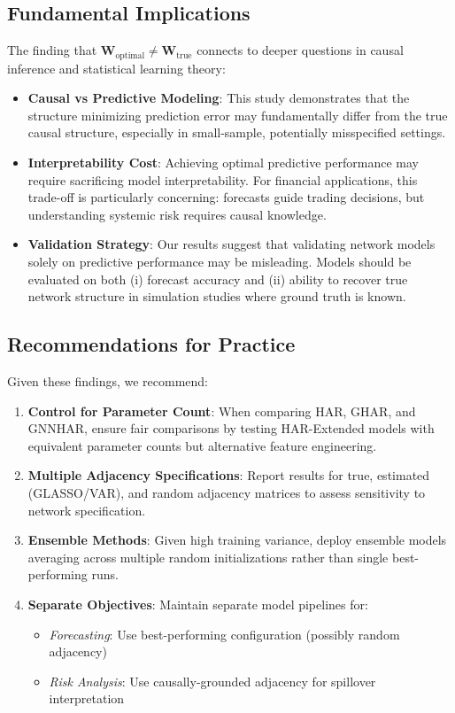 \documentclass[10pt,a4paper]{article}
\begin{document}
\subsection{Fundamental Implications}

The finding that $\mathbf{W}_{\text{optimal}} \neq \mathbf{W}_{\text{true}}$ connects to deeper questions in causal inference and statistical learning theory:

\begin{itemize}
\item \textbf{Causal vs Predictive Modeling}: This study demonstrates that the structure minimizing prediction error may fundamentally differ from the true causal structure, especially in small-sample, potentially misspecified settings.

\item \textbf{Interpretability Cost}: Achieving optimal predictive performance may require sacrificing model interpretability. For financial applications, this trade-off is particularly concerning: forecasts guide trading decisions, but understanding systemic risk requires causal knowledge.

\item \textbf{Validation Strategy}: Our results suggest that validating network models solely on predictive performance may be misleading. Models should be evaluated on both (i) forecast accuracy and (ii) ability to recover true network structure in simulation studies where ground truth is known.
\end{itemize}

\subsection{Recommendations for Practice}

Given these findings, we recommend:

\begin{enumerate}
\item \textbf{Control for Parameter Count}: When comparing HAR, GHAR, and GNNHAR, ensure fair comparisons by testing HAR-Extended models with equivalent parameter counts but alternative feature engineering.

\item \textbf{Multiple Adjacency Specifications}: Report results for true, estimated (GLASSO/VAR), and random adjacency matrices to assess sensitivity to network specification.

\item \textbf{Ensemble Methods}: Given high training variance, deploy ensemble models averaging across multiple random initializations rather than single best-performing runs.

\item \textbf{Separate Objectives}: Maintain separate model pipelines for:
\begin{itemize}
\item \textit{Forecasting}: Use best-performing configuration (possibly random adjacency)
\item \textit{Risk Analysis}: Use causally-grounded adjacency for spillover interpretation
\end{itemize}
\end{enumerate}
\end{document}
